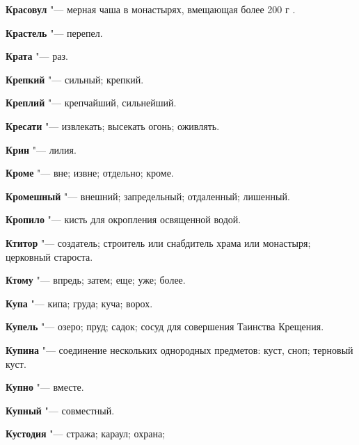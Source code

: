 \begin{mymulticols}{2}
\noindent\textbf{Красовул} "--- мерная чаша в монастырях, вмещающая более 200 г . 




\noindent\textbf{Крастель} "--- перепел. 




\noindent\textbf{Крата} "--- раз. 




\noindent\textbf{Крепкий} "--- сильный; крепкий. 




\noindent\textbf{Креплий} "--- крепчайший, сильнейший. 




\noindent\textbf{Кресати} "--- извлекать; высекать огонь; оживлять. 




\noindent\textbf{Крин} "--- лилия. 




\noindent\textbf{Кроме} "--- вне; извне; отдельно; кроме. 




\noindent\textbf{Кромешный} "--- внешний; запредельный; отдаленный; лишенный. 




\noindent\textbf{Кропило} "--- кисть для окропления освященной водой. 




\noindent\textbf{Ктитор} "--- создатель; строитель или снабдитель храма или монастыря; церковный староста. 




\noindent\textbf{Ктому} "--- впредь; затем; еще; уже; более. 




\noindent\textbf{Купа} "--- кипа; груда; куча; ворох. 




\noindent\textbf{Купель} "--- озеро; пруд; садок; сосуд для совершения Таинства Крещения. 




\noindent\textbf{Купина} "--- соединение нескольких однородных предметов: куст, сноп; терновый куст. 




\noindent\textbf{Купно} "--- вместе. 




\noindent\textbf{Купный} "--- совместный. 




\noindent\textbf{Кустодия} "--- стража; караул; охрана; 





\end{mymulticols}
